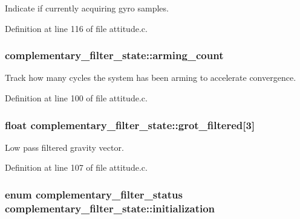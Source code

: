 Indicate if currently acquiring gyro samples. 



Definition at line 116 of file attitude.\-c.

\hypertarget{structcomplementary__filter__state_a25592bc35eb34062d082854dd0dbce44}{
\subsubsection[{arming\-\_\-count}]{ complementary\-\_\-filter\-\_\-state\-::arming\-\_\-count}}\label{structcomplementary__filter__state_a25592bc35eb34062d082854dd0dbce44}


Track how many cycles the system has been arming to accelerate convergence. 



Definition at line 100 of file attitude.\-c.

\hypertarget{structcomplementary__filter__state_a91176df07de5e650a8afe8bec74d3ce1}{
\subsubsection[{grot\-\_\-filtered}]{\setlength{\rightskip}{0pt plus 5cm}float complementary\-\_\-filter\-\_\-state\-::grot\-\_\-filtered\mbox{[}3\mbox{]}}}\label{structcomplementary__filter__state_a91176df07de5e650a8afe8bec74d3ce1}


Low pass filtered gravity vector. 



Definition at line 107 of file attitude.\-c.

\hypertarget{structcomplementary__filter__state_a28dd748e22efb34aa6dddf4873b1c445}{
\subsubsection[{initialization}]{\setlength{\rightskip}{0pt plus 5cm}enum {\bf complementary\-\_\-filter\-\_\-status} complementary\-\_\-filter\-\_\-state\-::initialization}}\label{structcomplementary__filter__state_a28dd748e22efb34aa6dddf4873b1c445}


